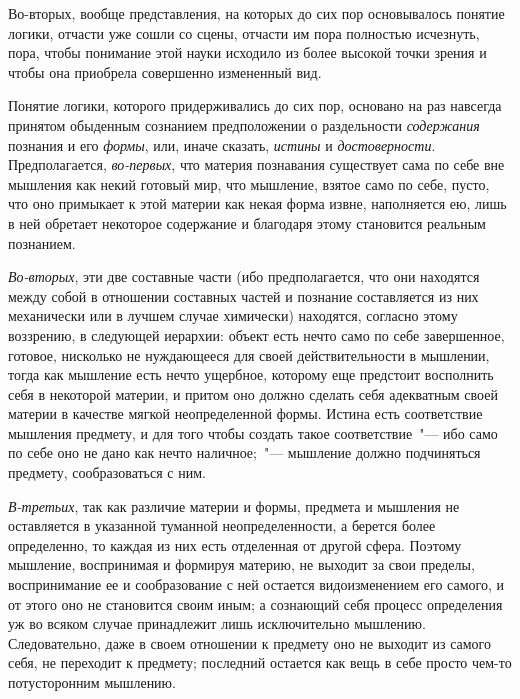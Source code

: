 Во-вторых, вообще представления, на которых до сих
пор основывалось понятие логики, отчасти уже сошли
со сцены, отчасти им пора полностью исчезнуть, пора,
чтобы понимание этой науки исходило из более высокой
точки зрения и чтобы она приобрела совершенно измененный
вид.

Понятие логики, которого придерживались до сих пор,
основано на раз навсегда принятом обыденным сознанием
предположении о раздельности \emph{содержания} познания
и его \emph{формы}, или, иначе сказать, \emph{истины} и \emph{достоверности}.
Предполагается, \emph{во-первых}, что материя познавания существует
сама по себе вне мышления как некий готовый
мир, что мышление, взятое само по себе, пусто, что оно
примыкает к этой материи как некая форма извне, наполняется
ею, лишь в ней обретает некоторое содержание
и благодаря этому становится реальным познанием.

\emph{Во-вторых}, эти две составные части (ибо предполагается,
что они находятся между собой в отношении составных
частей и познание составляется из них механически
или в лучшем случае химически)\endnotemark{} находятся,
согласно этому воззрению, в следующей иерархии: объект
есть нечто само по себе завершенное, готовое,
нисколько не нуждающееся для своей действительности
в мышлении, тогда как мышление есть нечто ущербное,
которому еще предстоит восполнить себя в некоторой
материи, и притом оно должно сделать себя адекватным
своей материи в качестве мягкой неопределенной формы.
Истина есть соответствие мышления предмету, и для
того чтобы создать такое соответствие~"--- ибо само по
себе оно не дано как нечто наличное;~"--- мышление должно
подчиняться предмету, сообразоваться с ним.


\emph{В-третьих}, так как различие материи и формы, предмета
и мышления не оставляется в указанной туманной
неопределенности, а берется более определенно, то каждая
из них есть отделенная от другой сфера. Поэтому
мышление, воспринимая и формируя материю, не выходит
за свои пределы, воспринимание ее и сообразование
с ней остается видоизменением его самого, и от этого
оно не становится своим иным; а сознающий себя процесс
определения уж во всяком случае принадлежит
лишь исключительно мышлению. Следовательно, даже в
своем отношении к предмету оно не выходит из самого
себя, не переходит к предмету; последний остается как
вещь в себе просто чем-то потусторонним мышлению.


